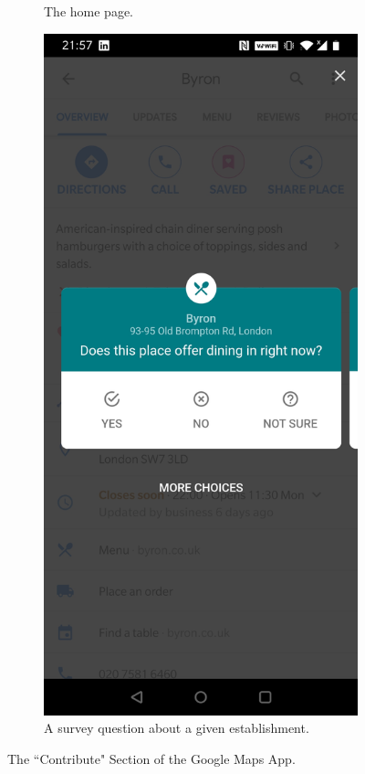 \begin{figure}[htb!]
\begin{center}
\begin{subfigure}{.3\textwidth}
            \caption{The home page.}
            \label{fig:gmaps_contrib_home}
        \end{subfigure}%
        \begin{subfigure}{.3\textwidth}
            \centering
            \includegraphics[width=0.8\linewidth]{images/gmaps_contribute_survey.jpg}
            \caption{A survey question about a given establishment.}
            \label{fig:gmaps_contrib_survey}
        \end{subfigure}%
        \caption{The ``Contribute" Section of the Google Maps App.}
        \label{fig:gmaps_contribute}
    \end{center}
\end{figure}


